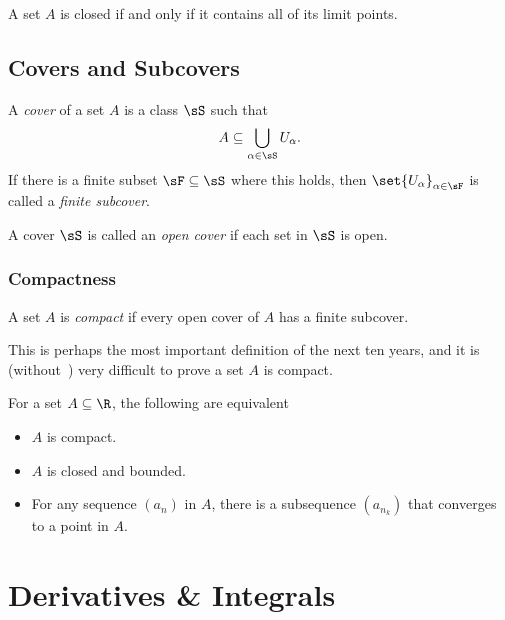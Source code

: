 \documentclass{article}
\begin{document}
\begin{thm}\label{defn:closed-iff-limit-points}
  A set $A$ is closed if and only if it contains all of its limit points.
\end{thm}

\subsection{Covers and Subcovers}

\begin{defn}[Cover]\label{defn:cover}
  A \emph{cover} of a set $A$ is a class $\sS$ such that
  \[ A \subseteq \bigcup_{\alpha \in \sS}U_{\alpha}. \]
  If there is a finite subset $\sF \subseteq \sS$ where this holds, then $\set{U_{\alpha}}_{\alpha \in \sF}$
  is called a \emph{finite subcover}.
\end{defn}

\begin{defn}\label{defn:open-cover}
  A cover $\sS$ is called an \emph{open cover} if each set in $\sS$ is open.
\end{defn}

\subsubsection{Compactness}

\begin{defn}[Compactness]\label{defn:compact-set}
  A set $A$ is \emph{compact} if every open cover of $A$ has a finite subcover.
\end{defn}
This is perhaps the most important definition of the next ten years, and it is (without~) very difficult
to prove a set $A$ is compact.

\begin{thm}\label{thm:heine-borel}
  For a set $A \subseteq \R$, the following are equivalent
  \begin{itemize}
    \item $A$ is compact.
    \item $A$ is closed and bounded.
    \item For any sequence $(a_{n})$ in $A$, there is a subsequence $(a_{n_{k}})$ that converges to a point in $A$.
  \end{itemize}
\end{thm}

\section*{Derivatives \& Integrals}
\end{document}
